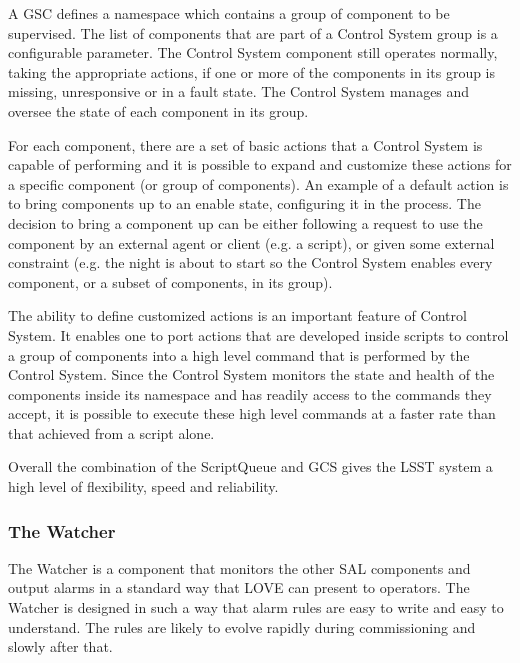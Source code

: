 A GSC defines a namespace which contains a group of component to be supervised. The list of components that are part of a Control System group is a configurable parameter. The Control System component still operates normally, taking the appropriate actions, if one or more of the components in its group is missing, unresponsive or in a fault state. The Control System manages and oversee the state of each component in its group. 

For each component, there are a set of basic actions that a Control System is capable of performing and it is possible to expand and customize these actions for a specific component (or group of components). An example of a default action is to bring components up to an enable state, configuring it in the process. The decision to bring a component up can be either following a request to use the component by an external agent or client (e.g. a script), or given some external constraint (e.g. the night is about to start so the Control System enables every component, or a subset of components, in its group).

The ability to define customized actions is an important feature of Control System. It enables one to port actions that are developed inside scripts to control a group of components into a high level command that is performed by the Control System. Since the Control System monitors the state and health of the components inside its namespace and has readily access to the commands they accept, it is possible to execute these high level commands at a faster rate than that achieved from a script alone.

Overall the combination of the ScriptQueue and GCS gives the LSST system a high level of flexibility, speed and reliability. 



\subsubsection{The Watcher}\label{sect:watcher}
The Watcher is a component that monitors the other SAL components and output alarms in a standard way that LOVE can present to operators. The Watcher is designed in such a way that alarm rules are easy to write and easy to understand. The rules are likely to evolve rapidly during commissioning and slowly after that.

